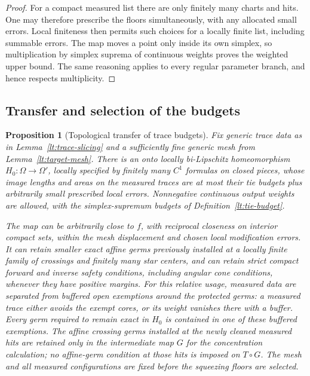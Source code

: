 \documentclass[11pt]{article}
\numberwithin{equation}{section}
\newtheorem{proposition}[theorem]{Proposition}
\theoremstyle{definition}
\theoremstyle{remark}
\begin{document}
\begin{proof}
For a compact measured list there are only finitely many charts and
hits.  One may therefore prescribe the floors simultaneously, with
any allocated small errors.  Local finiteness then permits such
choices for a locally finite list, including summable errors.  The
map moves a point only inside its own simplex, so multiplication by
simplex suprema of continuous weights proves the weighted upper
bound.  The same reasoning applies to every regular parameter
branch, and hence respects multiplicity.
\end{proof}

\subsection{Transfer and selection of the budgets}

\begin{proposition}[Topological transfer of trace budgets]
\label{lt:budget-transfer}
Fix generic trace data as in Lemma~\ref{lt:trace-slicing} and a
sufficiently fine generic mesh from Lemma~\ref{lt:target-mesh}.
There is an onto locally bi-Lipschitz homeomorphism
$H_0:\Omega\to\Omega'$, locally specified by finitely many
$C^1$ formulas on closed pieces, whose image lengths and areas on
the measured traces are at most their tie budgets plus arbitrarily
small prescribed local errors.  Nonnegative continuous output
weights are allowed, with the simplex-supremum budgets of
Definition~\ref{lt:tie-budget}.

The map can be arbitrarily close to $f$, with reciprocal closeness
on interior compact sets, within the mesh displacement and chosen
local modification errors.  It can retain smaller exact affine
germs previously installed at a locally finite family of crossings
and finitely many star centers, and can retain strict compact
forward and inverse safety conditions, including angular cone
conditions, whenever they have positive margins.  For this relative
usage, measured data are separated from buffered open exemptions
around the protected germs: a measured trace either avoids the
exempt cores, or its weight vanishes there with a buffer.  Every
germ required to remain exact in $H_0$ is contained in one of these
buffered exemptions.  The affine crossing germs installed at the
newly cleaned measured hits are retained only in the intermediate
map $G$ for the concentration calculation; no affine-germ condition
at those hits is imposed on $T\circ G$.  The mesh and all measured
configurations are fixed before the squeezing floors are selected.
\end{proposition}
\end{document}

